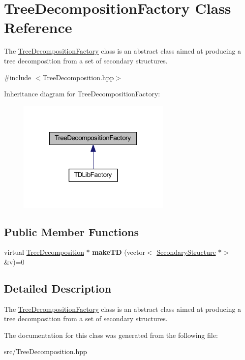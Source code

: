 \hypertarget{class_tree_decomposition_factory}{}\section{Tree\+Decomposition\+Factory Class Reference}
\label{class_tree_decomposition_factory}


The \hyperlink{class_tree_decomposition_factory}{Tree\+Decomposition\+Factory} class is an abstract class aimed at producing a tree decomposition from a set of secondary structures.  




{\ttfamily \#include $<$Tree\+Decomposition.\+hpp$>$}



Inheritance diagram for Tree\+Decomposition\+Factory\+:\nopagebreak
\begin{figure}[H]
\begin{center}
\leavevmode
\includegraphics[width=212pt]{class_tree_decomposition_factory__inherit__graph}
\end{center}
\end{figure}
\subsection*{Public Member Functions}
\begin{DoxyCompactItemize}
\item 
\mbox{\label{class_tree_decomposition_factory_a249cdde92245b4add19fafa00ad9be52}} 
virtual \hyperlink{class_tree_decomposition}{Tree\+Decomposition} $\ast$ {\bfseries make\+TD} (vector$<$ \hyperlink{class_secondary_structure}{Secondary\+Structure} $\ast$$>$ \&v)=0
\end{DoxyCompactItemize}


\subsection{Detailed Description}
The \hyperlink{class_tree_decomposition_factory}{Tree\+Decomposition\+Factory} class is an abstract class aimed at producing a tree decomposition from a set of secondary structures. 

The documentation for this class was generated from the following file\+:\begin{DoxyCompactItemize}
\item 
src/Tree\+Decomposition.\+hpp\end{DoxyCompactItemize}
